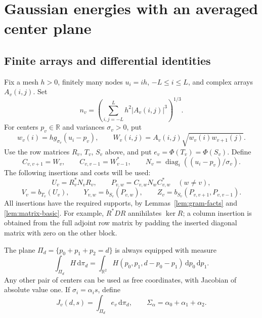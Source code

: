 \documentclass[11pt]{article}
\theoremstyle{remark}\newtheorem{remark}[theorem]{Remark}
\newcommand{\R}{\mathbb R}\newcommand{\C}{\mathbb C}
\newcommand{\dd}{\,\mathrm d}\newcommand{\tr}{\operatorname{tr}}
\begin{document}
\section{Gaussian energies with an averaged center plane}\label{sec:heat}
\subsection{Finite arrays and differential identities}
Fix a mesh $h>0$, finitely many nodes $u_i=ih$, $-L\leq i\leq L$, and complex arrays $A_v(i,j)$. Set
\[
 n_v=\left(\sum_{i,j=-L}^L h^2|A_v(i,j)|^3\right)^{1/3}.
\]
For centers $p_v\in\R$ and variances $\sigma_v>0$, put
\[
 w_v(i)=h g_{\sigma_v}(u_i-p_v),\qquad
 W_v(i,j)=A_v(i,j)\sqrt{w_v(i)w_{v+1}(j)}.
\]
Use the row matrices $R_v$, $T_v$, $S_v$ above, and put $e_v=\Phi(T_v)=\Phi(S_v)$. Define
\[
 C_{v,v+1}=W_v,\qquad C_{v,v-1}=W_{v-1}^*,\qquad
 N_v=\operatorname{diag}_i((u_i-p_v)/\sigma_v).
\]
The following insertions and costs will be used:
\[
 U_v=R_v^*N_vR_v,\qquad P_{v,w}=C_{v,w}N_wC_{v,w}^*\quad(w\ne v),
\]
\[
 V_v=b_{T_v}(U_v),\qquad Y_{v,w}=b_{S_v}(P_{v,w}),\qquad
 Z_v=b_{S_v}(P_{v,v+1},P_{v,v-1}).
\]
All insertions have the required supports, by Lemmas~\ref{lem:gram-facts} and \ref{lem:matrix-basic}. For example, $R^*DR$ annihilates $\ker R$; a column insertion is obtained from the full adjoint row matrix by padding the inserted diagonal matrix with zero on the other block.

The plane $\Pi_d=\{p_0+p_1+p_2=d\}$ is always equipped with measure
\[
 \int_{\Pi_d}H\dd\pi_d
 =\int_{\R^2}H(p_0,p_1,d-p_0-p_1)\dd p_0\dd p_1.
\]
Any other pair of centers can be used as free coordinates, with Jacobian of absolute value one. If $\sigma_i=\alpha_i s$, define
\[
 J_v(d,s)=\int_{\Pi_d}e_v\dd\pi_d,\qquad \Sigma_\alpha=\alpha_0+\alpha_1+\alpha_2.
\]
\end{document}

